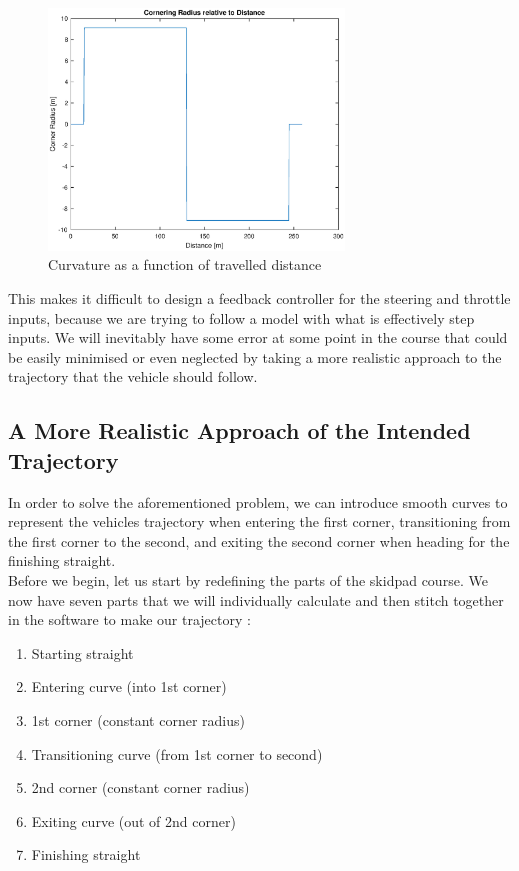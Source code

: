 \documentclass[a4paper, 11pt]{article}
\begin{document}
\begin{figure}[H]
	\centering
	\includegraphics[width = 0.7\textwidth]{Figures/CornerRadiusDistance.eps}
	\caption{Curvature as a function of travelled distance}
	\label{fig:CornerRadiusAFDistanceSimpleModel}
\end{figure}

This makes it difficult to design a feedback controller for the steering and throttle inputs, because we are trying to follow a model with what is effectively step inputs. We will inevitably have some error at some point in the course that could be easily minimised or even neglected by taking a more realistic approach to the trajectory that the vehicle should follow.\\

\subsection{A More Realistic Approach of the Intended Trajectory}

In order to solve the aforementioned problem, we can introduce smooth curves to represent the vehicles trajectory when entering the first corner, transitioning from the first corner to the second, and exiting the second corner when heading for the finishing straight.\\

Before we begin, let us start by redefining the parts of the skidpad course. We now have seven parts that we will individually calculate and then stitch together in the software to make our trajectory :
\begin{enumerate}
	\item Starting straight
	\item Entering curve (into 1st corner)
	\item 1st corner (constant corner radius)
	\item Transitioning curve (from 1st corner to second)
	\item 2nd corner (constant corner radius)
	\item Exiting curve (out of 2nd corner)
	\item Finishing straight
\end{enumerate}
\end{document}
